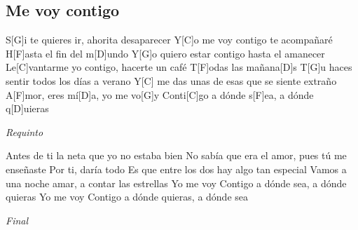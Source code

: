 \subsection{Me voy contigo}
\noindent

\vspace{1cm}

\begin{guitar}
	\begin{multicols}{2}
		\par

		S[G]i te quieres ir, ahorita desaparecer
		Y[C]o me voy contigo te acompañaré
		H[F]asta el fin del m[D]undo
		Y[G]o quiero estar contigo hasta el amanecer
		Le[C]vantarme yo contigo, hacerte un café
		T[F]odas las mañana[D]s
		T[G]u haces sentir todos los días a verano
		Y[C] me das unas de esas que se siente extraño
		A[F]mor, eres mí[D]a, yo me vo[G]y
		Conti[C]go a dónde s[F]ea, a dónde q[D]uieras

		\par
		\textit{Requinto}
		\par

		Antes de ti la neta que yo no estaba bien
		No sabía que era el amor, pues tú me enseñaste
		Por ti, daría todo
		Es que entre los dos hay algo tan especial
		Vamos a una noche amar, a contar las estrellas
		Yo me voy
		Contigo a dónde sea, a dónde quieras
		Yo me voy
		Contigo a dónde quieras, a dónde sea

		\par
		\textit{Final}
	\end{multicols}
\end{guitar}
